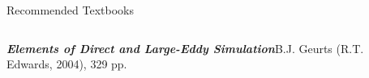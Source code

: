 
\begin{frame}{Recommended Textbooks}

\setlength{\fboxsep}{0pt}
\setlength{\fboxrule}{1pt}
\begin{columns}[T]
    \begin{column}{.75\textwidth}
      \begin{minipage}[c][.5\textheight][c]{\linewidth}
      \emph{\textbf{Elements of Direct and Large-Eddy Simulation}}\newline B.J. Geurts (R.T. Edwards, 2004), 329 pp.
      \end{minipage}
    \end{column}
    \begin{column}{.25\textwidth}
    \end{column}
  \end{columns}
\end{frame}


